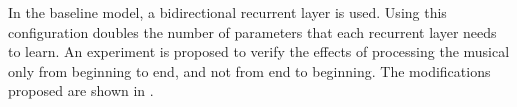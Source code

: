 
In the baseline model, a bidirectional recurrent layer is
used. Using this configuration doubles the number of
parameters that each recurrent layer needs to learn. An
experiment is proposed to verify the effects of processing
the musical only from beginning to end, and not from end to
beginning. The modifications proposed are shown in
.


